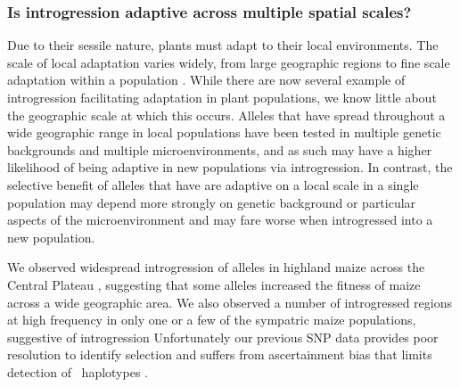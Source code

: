 \subsubsection{Is introgression adaptive across multiple spatial scales?}
\label{sss:scale}

Due to their sessile nature, plants must adapt to their local environments. 
The scale of local adaptation varies widely, from large geographic regions \citep{lowry2010, fang2014} to fine scale adaptation within a population \citep{hamrick1979}.  
While there are now several example of introgression facilitating adaptation in plant populations, we know little about the geographic scale at which this occurs.
Alleles that have spread throughout a wide geographic range in local populations have been tested in multiple genetic backgrounds and multiple microenvironments, and as such may have a higher likelihood of being adaptive in new populations via introgression.
In contrast, the selective benefit of alleles that have are adaptive on a local scale in a single population may depend more strongly on genetic background or particular aspects of the microenvironment and may fare worse when introgressed into a new population. 

We observed widespread introgression of \zm{} alleles in highland maize across the Central Plateau \citep{Hufford2013}, suggesting that some \zm{} alleles increased the fitness of maize across a wide geographic area.  
We also observed a number of introgressed regions at high frequency in only one or a few of the sympatric maize populations, suggestive of introgression
Unfortunately our previous SNP data provides poor resolution to identify selection \citep{tiffin2014advances} and suffers from ascertainment bias that limits detection of \zm\ haplotypes \citep{Hufford2013}.  

